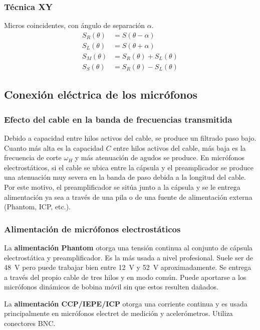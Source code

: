 \documentclass[a4paper, 8pt]{extarticle}
\begin{document}
\begin{multicols}{3}
  \subsubsection{Técnica XY}
  Micros coincidentes, con ángulo de separación $\alpha$.
  \begin{align*}
    S_R (\theta )  & = S(\theta - \alpha )             \\
    S_L (\theta )  & = S(\theta + \alpha  )            \\
    S_M ( \theta ) & = S_R ( \theta ) + S_L ( \theta ) \\
    S_S ( \theta ) & = S_R ( \theta ) - S_L ( \theta )
  \end{align*}


  \subsection{Conexión eléctrica de los micrófonos}
  \subsubsection{Efecto del cable en la banda de frecuencias transmitida}
  Debido a capacidad entre hilos activos del cable, se produce un filtrado paso bajo. Cuanto más alta es la capacidad $C$ entre hilos activos del cable, más baja es la frecuencia de corte $\omega _H$ y más atenuación de agudos se produce. En micrófonos electrostáticos, si el cable se ubica entre la cápsula y el preamplicador se produce una atenuación muy severa en la banda de paso debida a la longitud del cable. Por este motivo, el preamplificador se sitúa junto a la cápsula y se le entrega alimentación ya sea a través de una pila o de una fuente de alimentación externa (Phantom, ICP, etc.).

  \subsubsection{Alimentación de micrófonos electrostáticos}

  La \textbf{alimentación Phantom} otorga una tensión continua al conjunto de cápsula electrostática y preamplificador. Es la más usada a nivel profesional. Suele ser de \qty{48}{\volt } pero puede trabajar bien entre \qty{12}{\volt } y \qty{52}{\volt } aproximadamente. Se entrega a través del propio cable de tres hilos y en modo común. Puede aportarse a los micrófonos dinámicos de bobina móvil sin que estos resulten dañados.

  La \textbf{alimentación CCP/IEPE/ICP} otorga una corriente continua y es usada principalmente en micrófonos electret de medición y acelerómetros. Utiliza conectores BNC.


\end{multicols}
\end{document}
